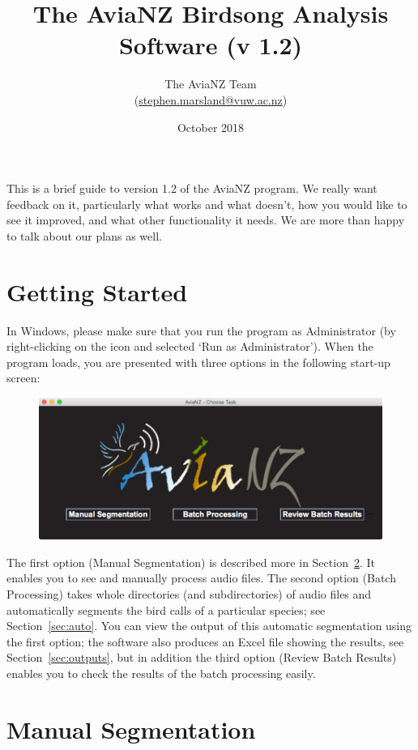 \documentclass{article}
\title{The AviaNZ Birdsong Analysis Software (v 1.2)}
\author{The AviaNZ Team \\(\url{stephen.marsland@vuw.ac.nz})}
\date{October 2018}
\begin{document}
\maketitle



This is a brief guide to version 1.2 of the AviaNZ program. 
We really want feedback on it, particularly what works and what doesn't, how you would like to see it improved, and what other functionality it needs. We are more than happy to talk about our plans as well. 


\section{Getting Started}

In Windows, please make sure that you run the program as Administrator (by right-clicking on the icon and selected `Run as Administrator'). 
When the program loads, you are presented with three options in the following start-up screen:

\begin{figure}[h!]
\centering
\includegraphics[width=.3\textwidth]{Figs/splashscreen}
\label{welcome}
\end{figure}

The first option (Manual Segmentation) is described more in Section~\ref{sec:manual}. It enables you to see and manually process audio files. The second option (Batch Processing) takes whole directories (and subdirectories) of audio files and automatically segments the bird calls of a particular species; see Section~\ref{sec:auto}. You can view the output of this automatic segmentation using the first option; the software also produces an Excel file showing the results, see Section~\ref{sec:outputs}, but in addition the third option (Review Batch Results) enables you to check the results of the batch processing easily. 

\section{Manual Segmentation}
\label{sec:manual}
\end{document}
